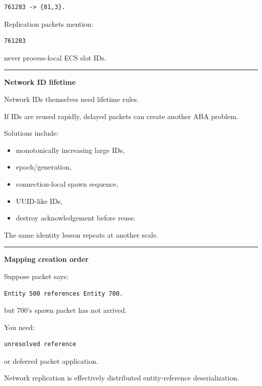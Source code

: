 \begin{verbatim}
761283 -> {81,3}.
\end{verbatim}

Replication packets mention:

\begin{verbatim}
761283
\end{verbatim}

never process-local ECS slot IDs.

\begin{center}\rule{0.5\linewidth}{0.5pt}\end{center}

\textbf{Network ID lifetime}

Network IDs themselves need lifetime rules.

If IDs are reused rapidly, delayed packets can create another ABA problem.

Solutions include:

\begin{itemize}
\tightlist
\item
  monotonically increasing large IDs,
\item
  epoch/generation,
\item
  connection-local spawn sequence,
\item
  UUID-like IDs,
\item
  destroy acknowledgement before reuse.
\end{itemize}

The same identity lesson repeats at another scale.

\begin{center}\rule{0.5\linewidth}{0.5pt}\end{center}

\textbf{Mapping creation order}

Suppose packet says:

\begin{verbatim}
Entity 500 references Entity 700.
\end{verbatim}

but 700's spawn packet has not arrived.

You need:

\begin{verbatim}
unresolved reference
\end{verbatim}

or deferred packet application.

Network replication is effectively distributed entity-reference deserialization.


